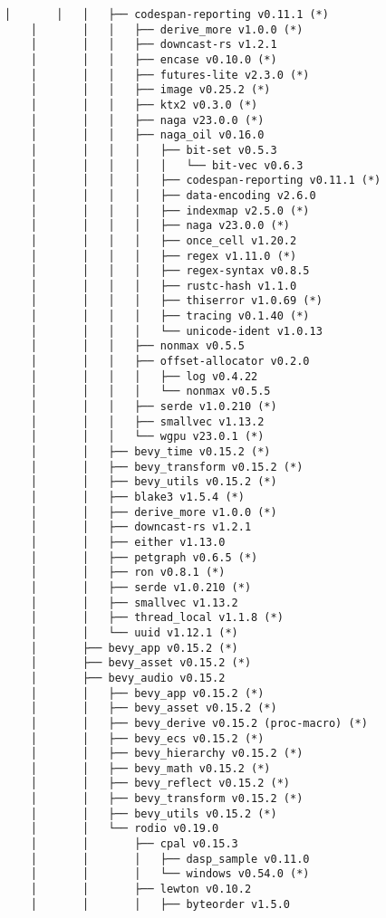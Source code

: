 \begin{lstlisting}[style=mystyle, caption={dependencias del proyecto}, label={lst:dependencias}]
    │       │   │   ├── codespan-reporting v0.11.1 (*)
    │       │   │   ├── derive_more v1.0.0 (*)
    │       │   │   ├── downcast-rs v1.2.1
    │       │   │   ├── encase v0.10.0 (*)
    │       │   │   ├── futures-lite v2.3.0 (*)
    │       │   │   ├── image v0.25.2 (*)
    │       │   │   ├── ktx2 v0.3.0 (*)
    │       │   │   ├── naga v23.0.0 (*)
    │       │   │   ├── naga_oil v0.16.0
    │       │   │   │   ├── bit-set v0.5.3
    │       │   │   │   │   └── bit-vec v0.6.3
    │       │   │   │   ├── codespan-reporting v0.11.1 (*)
    │       │   │   │   ├── data-encoding v2.6.0
    │       │   │   │   ├── indexmap v2.5.0 (*)
    │       │   │   │   ├── naga v23.0.0 (*)
    │       │   │   │   ├── once_cell v1.20.2
    │       │   │   │   ├── regex v1.11.0 (*)
    │       │   │   │   ├── regex-syntax v0.8.5
    │       │   │   │   ├── rustc-hash v1.1.0
    │       │   │   │   ├── thiserror v1.0.69 (*)
    │       │   │   │   ├── tracing v0.1.40 (*)
    │       │   │   │   └── unicode-ident v1.0.13
    │       │   │   ├── nonmax v0.5.5
    │       │   │   ├── offset-allocator v0.2.0
    │       │   │   │   ├── log v0.4.22
    │       │   │   │   └── nonmax v0.5.5
    │       │   │   ├── serde v1.0.210 (*)
    │       │   │   ├── smallvec v1.13.2
    │       │   │   └── wgpu v23.0.1 (*)
    │       │   ├── bevy_time v0.15.2 (*)
    │       │   ├── bevy_transform v0.15.2 (*)
    │       │   ├── bevy_utils v0.15.2 (*)
    │       │   ├── blake3 v1.5.4 (*)
    │       │   ├── derive_more v1.0.0 (*)
    │       │   ├── downcast-rs v1.2.1
    │       │   ├── either v1.13.0
    │       │   ├── petgraph v0.6.5 (*)
    │       │   ├── ron v0.8.1 (*)
    │       │   ├── serde v1.0.210 (*)
    │       │   ├── smallvec v1.13.2
    │       │   ├── thread_local v1.1.8 (*)
    │       │   └── uuid v1.12.1 (*)
    │       ├── bevy_app v0.15.2 (*)
    │       ├── bevy_asset v0.15.2 (*)
    │       ├── bevy_audio v0.15.2
    │       │   ├── bevy_app v0.15.2 (*)
    │       │   ├── bevy_asset v0.15.2 (*)
    │       │   ├── bevy_derive v0.15.2 (proc-macro) (*)
    │       │   ├── bevy_ecs v0.15.2 (*)
    │       │   ├── bevy_hierarchy v0.15.2 (*)
    │       │   ├── bevy_math v0.15.2 (*)
    │       │   ├── bevy_reflect v0.15.2 (*)
    │       │   ├── bevy_transform v0.15.2 (*)
    │       │   ├── bevy_utils v0.15.2 (*)
    │       │   └── rodio v0.19.0
    │       │       ├── cpal v0.15.3
    │       │       │   ├── dasp_sample v0.11.0
    │       │       │   └── windows v0.54.0 (*)
    │       │       ├── lewton v0.10.2
    │       │       │   ├── byteorder v1.5.0

\end{lstlisting}
